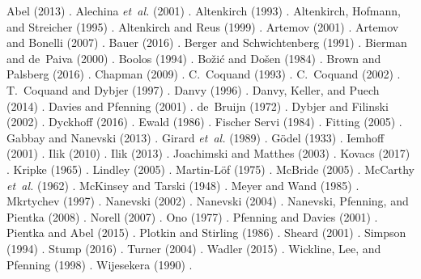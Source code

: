 \documentclass{entcs}
\renewcommand{\:}{\mathrel{:}}
\renewcommand{\;}{\mathbin{;}}
\newcommand{\0}{\varnothing}
\begin{document}
Abel (2013) \cite{Abel2013}.
Alechina \emph{et~al.} (2001) \cite{AlechinaMPR2001}.
Altenkirch (1993) \cite{Altenkirch1993}.
Altenkirch, Hofmann, and Streicher (1995) \cite{AltenkirchHS1995}.
Altenkirch and Reus (1999) \cite{AltenkirchR1999}.
Artemov (2001) \cite{Artemov2001}.
Artemov and Bonelli (2007) \cite{ArtemovB2007}.
Bauer (2016) \cite{Bauer2016}.
Berger and Schwichtenberg (1991) \cite{BergerS1991}.
Bierman and de~Paiva (2000) \cite{BiermanP2000}.
Boolos (1994) \cite{Boolos1994}.
Bo\v{z}i\'{c} and Do\v{s}en (1984) \cite{BozicD1984}.
Brown and Palsberg (2016) \cite{BrownP2016}.
Chapman (2009) \cite{Chapman2009}.
C.~Coquand (1993) \cite{Coquand1993}.
C.~Coquand (2002) \cite{Coquand2002}.
T.~Coquand and Dybjer (1997) \cite{CoquandD1997}.
Danvy (1996) \cite{Danvy1996}.
Danvy, Keller, and Puech (2014) \cite{DanvyKP2014}.
Davies and Pfenning (2001) \cite{DaviesP2001}.
de~Bruijn (1972) \cite{DeBruijn1972}.
Dybjer and Filinski (2002) \cite{DybjerF2002}.
Dyckhoff (2016) \cite{Dyckhoff2016}.
Ewald (1986) \cite{Ewald1986}.
Fischer Servi (1984) \cite{FischerServi1984}.
Fitting (2005) \cite{Fitting2005}.
Gabbay and Nanevski (2013) \cite{GabbayN2013}.
Girard \emph{et~al.} (1989) \cite{GirardTL1989}.
G\"{o}del (1933) \cite{Goedel1933}.
Iemhoff (2001) \cite{Iemhoff2001}.
Ilik (2010) \cite{Ilik2010}.
Ilik (2013) \cite{Ilik2013}.
Joachimski and Matthes (2003) \cite{JoachimskiM2003}.
Kovacs (2017) \cite{Kovacs2017}.
Kripke (1965) \cite{Kripke1965}.
Lindley (2005) \cite{Lindley2005}.
Martin-L\"{o}f (1975) \cite{MartinLoef1975}.
McBride (2005) \cite{McBride2005}.
McCarthy \emph{et~al.} (1962) \cite{McCarthyAEHL1962}.
McKinsey and Tarski (1948) \cite{McKinseyT1948}.
Meyer and Wand (1985) \cite{MeyerW1985}.
Mkrtychev (1997) \cite{Mkrtychev1997}.
Nanevski (2002) \cite{Nanevski2002}.
Nanevski (2004) \cite{Nanevski2004}.
Nanevski, Pfenning, and Pientka (2008) \cite{NanevskiPP2008}.
Norell (2007) \cite{Norell2007}.
Ono (1977) \cite{Ono1977}.
Pfenning and Davies (2001) \cite{PfenningD2001}.
Pientka and Abel (2015) \cite{PientkaA2015}.
Plotkin and Stirling (1986) \cite{PlotkinS1986}.
Sheard (2001) \cite{Sheard2001}.
Simpson (1994) \cite{Simpson1994}.
Stump (2016) \cite{Stump2016}.
Turner (2004) \cite{Turner2004}.
Wadler (2015) \cite{Wadler2015}.
Wickline, Lee, and Pfenning (1998) \cite{WicklineLP1998}.
Wijesekera (1990) \cite{Wijesekera1990}.




\end{document}

